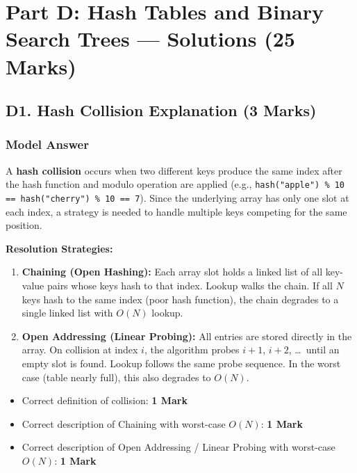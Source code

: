 \documentclass[11pt,a4paper]{article}
\newenvironment{markbox}[1]{%
    \begin{tcolorbox}[colback=markgreen!6!white, colframe=markgreen, title=\textbf{Mark Allocation --- #1}]
}{%
    \end{tcolorbox}
}
\begin{document}
\section{Part D: Hash Tables and Binary Search Trees --- Solutions (25 Marks)}

\subsection*{D1. Hash Collision Explanation (3 Marks)}

\subsubsection*{Model Answer}
A \textbf{hash collision} occurs when two different keys produce the same index after the hash function and modulo operation are applied (e.g., \texttt{hash("apple") \% 10 == hash("cherry") \% 10 == 7}). Since the underlying array has only one slot at each index, a strategy is needed to handle multiple keys competing for the same position.

\textbf{Resolution Strategies:}
\begin{enumerate}
    \item \textbf{Chaining (Open Hashing):} Each array slot holds a linked list of all key-value pairs whose keys hash to that index. Lookup walks the chain. If all $N$ keys hash to the same index (poor hash function), the chain degrades to a single linked list with $O(N)$ lookup.
    \item \textbf{Open Addressing (Linear Probing):} All entries are stored directly in the array. On collision at index $i$, the algorithm probes $i+1$, $i+2$, \ldots\ until an empty slot is found. Lookup follows the same probe sequence. In the worst case (table nearly full), this also degrades to $O(N)$.
\end{enumerate}

\begin{markbox}{D1 --- 3 Marks}
\begin{itemize}
    \item Correct definition of collision: \textbf{1 Mark}
    \item Correct description of Chaining with worst-case $O(N)$: \textbf{1 Mark}
    \item Correct description of Open Addressing / Linear Probing with worst-case $O(N)$: \textbf{1 Mark}
\end{itemize}
\end{markbox}
\end{document}
